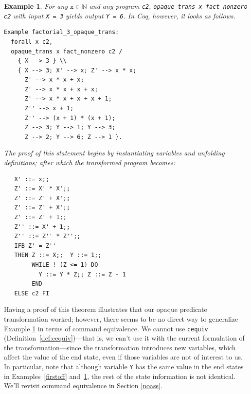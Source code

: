 \documentclass[compsoc,conference,a4paper,10pt,times]{IEEEtran}
\newtheorem{example}[theorem]{Example}
\begin{document}
\begin{example}\label{firstfact}
    For any $\mathtt{x}\in \mathbb{N}$ and any program \texttt{c2}, \texttt{opaque\_trans x fact\_nonzero c2} with input \texttt{X = 3} yields output \texttt{Y = 6}.  In Coq, however, it looks as follows.
\begin{verbatim}
Example factorial_3_opaque_trans:
  forall x c2, 
  opaque_trans x fact_nonzero c2 /
    { X --> 3 } \\
    { X --> 3; X' --> x; Z' --> x * x; 
      Z' --> x * x + x; 
      Z' --> x * x + x + x;
      Z' --> x * x + x + x + 1; 
      Z'' --> x + 1; 
      Z'' --> (x + 1) * (x + 1); 
      Z --> 3; Y --> 1; Y --> 3; 
      Z --> 2; Y --> 6; Z --> 1 }.
\end{verbatim}

The proof of this statement begins by instantiating variables and unfolding definitions; after which the transformed program becomes: 
\begin{verbatim}
   X' ::= x;;
   Z' ::= X' * X';;
   Z' ::= Z' + X';;
   Z' ::= Z' + X';;
   Z' ::= Z' + 1;;
   Z'' ::= X' + 1;;
   Z'' ::= Z'' * Z'';;
   IFB Z' = Z'' 
   THEN Z ::= X;;  Y ::= 1;;
        WHILE ! (Z <= 1) DO
          Y ::= Y * Z;; Z ::= Z - 1 
        END
   ELSE c2 FI
\end{verbatim}
\end{example}

Having a proof of this theorem illustrates that our opaque predicate transformation worked; however, there seems to be no direct way to generalize Example \ref{firstfact} in terms of command equivalence. We cannot use \texttt{cequiv} (Definition~\ref{def:cequiv})---that is, we can't use it with the current formulation of the transformation---since the transformation introduces new variables, which affect the value of the end state, even if those variables are not of interest to us. In particular, note that although variable \texttt{Y} has the same value in the end states in Examples~\ref{firstoff} and~\ref{firstfact}, the rest of the state information is not identical. We'll revisit command equivalence in Section \ref{noass}.
      
\end{document}
